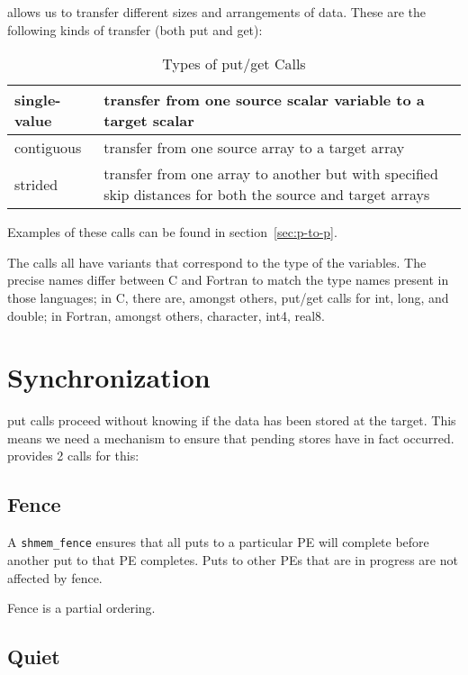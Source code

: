 \openshmem allows us to transfer different sizes and arrangements of
data.  These are the following kinds of transfer (both put and
get):

\vspace{0.2in}
\begin{table}[h]
  \begin{center}
    \caption{Types of put/get Calls}
    \begin{tabular}{|p{}|p{}|}
    \hline
    single-value     & transfer from one source scalar variable to a target scalar \tabularnewline
    \hline
    contiguous       & transfer from one source array to a target array \tabularnewline
    \hline
    strided          & transfer from one array to another but with specified skip distances for both the source and target arrays \tabularnewline
    \hline
    \end{tabular}
  \end{center}
\end{table}
\vspace{0.2in}

Examples of these calls can be found in section~\ref{sec:p-to-p}.

The calls all have variants that correspond to the type of the
variables.  The precise names differ between C and Fortran to match
the type names present in those languages; in C, there are, amongst
others, put/get calls for int, long, and double; in Fortran, amongst
others, character, int4, real8.

\section{Synchronization}

\openshmem put calls proceed without knowing if the data has been
stored at the target.  This means we need a mechanism to ensure that
pending stores have in fact occurred.  \openshmem provides 2 calls for
this:

\subsection{Fence}

A \texttt{shmem\_fence} ensures that all puts to a particular PE will
complete before another put to that PE completes.  Puts to other PEs
that are in progress are not affected by fence.

Fence is a partial ordering.

\subsection{Quiet}

